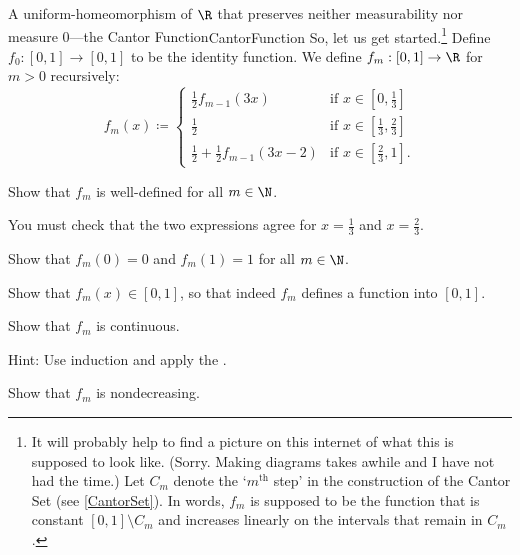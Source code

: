 \begin{exm}{A uniform-homeomorphism of $\R$ that preserves neither measurability nor measure $0$---the Cantor Function}{CantorFunction}
So, let us get started.\footnote{It will probably help to find a picture on this internet of what this is supposed to look like.  (Sorry.  Making diagrams takes awhile and I have not had the time.)  Let $C_m$ denote the `$m^{\text{th}}$ step' in the construction of the Cantor Set (see \cref{CantorSet}).  In words, $f_m$ is supposed to be the function that is constant $[0,1]\setminus C_m$ and increases linearly on the intervals that remain in $C_m$.}  Define $f_0:[0,1]\rightarrow [0,1]$ to be the identity function.  We define $f_m:[0,1]\rightarrow \R$ for $m>0$ recursively:
\begin{equation}\label{5.2.22}
f_m(x)\coloneqq \begin{cases}\tfrac{1}{2}f_{m-1}(3x) & \text{if }x\in [0,\tfrac{1}{3}] \\ \tfrac{1}{2} & \text{if }x\in [\tfrac{1}{3},\tfrac{2}{3}] \\ \tfrac{1}{2}+\tfrac{1}{2}f_{m-1}(3x-2) & \text{if }x\in [\tfrac{2}{3},1].\end{cases}
\end{equation}
\begin{exr}[breakable=false]{}{}
Show that $f_m$ is well-defined for all $m\in \N$.
\begin{rmk}
You must check that the two expressions agree for $x=\frac{1}{3}$ and $x=\frac{2}{3}$.
\end{rmk}
\end{exr}
\begin{exr}[breakable=false]{}{}
Show that $f_m(0)=0$ and $f_m(1)=1$ for all $m\in \N$.
\end{exr}
\begin{exr}[breakable=false]{}{}
Show that $f_m(x)\in [0,1]$, so that indeed $f_m$ defines a function into $[0,1]$.
\end{exr}
\begin{exr}[breakable=false]{}{}
Show that $f_m$ is continuous.
\begin{rmk}
Hint:  Use induction and apply the .
\end{rmk}
\end{exr}
\begin{exr}[breakable=false]{}{}
Show that $f_m$ is nondecreasing.
\end{exr}


\end{exm}
